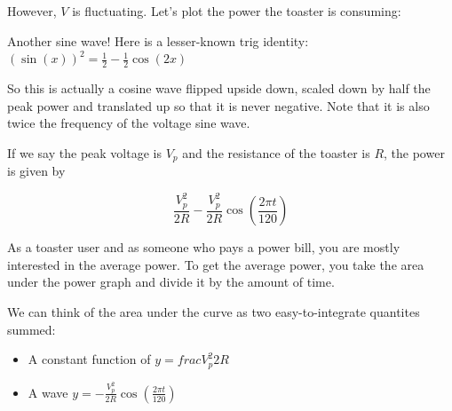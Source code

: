 However, $V$ is fluctuating. Let's plot the power the toaster is consuming:


Another sine wave! Here is a lesser-known trig identity: $\left( \sin(x) \right)^2 = \frac{1}{2} - \frac{1}{2}\cos(2x)$

So this is actually a cosine wave flipped upside down, scaled down by
half the peak power and translated up so that it is never
negative. Note that it is also twice the frequency of the voltage sine
wave.

If we say the peak voltage is $V_p$ and the resistance of the toaster
is $R$, the power is given by

$$\frac{V_p^2}{2R} - \frac{V_p^2}{2R} \cos \left(\frac{2\pi t}{120} \right)$$

As a toaster user and as someone who pays a power bill, you are mostly
interested in the average power.  To get the average power, you take
the area under the power graph and divide it by the amount of time.

We can think of the area under the curve as two easy-to-integrate quantites summed:
\begin{itemize}
\item A constant function of $y = frac{V_p^2}{2R}$
\item A wave $y = - \frac{V_p^2}{2R} \cos \left(\frac{2\pi t}{120} \right)$
\end{itemize}

